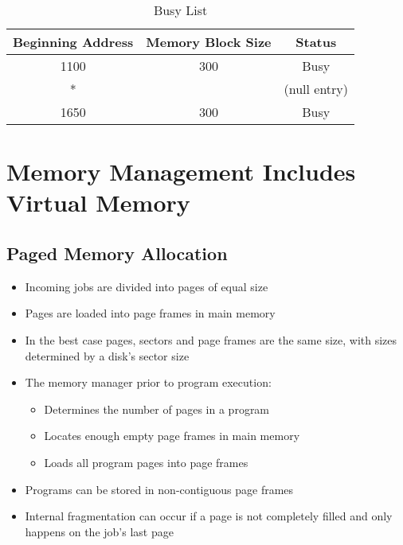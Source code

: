 \documentclass[12pt letter]{report}
\begin{document}
\begin{table}[H]
  \caption{Busy List}
  \begin{center}
    \begin{tabular}{|c c c|}
      \hline
      Beginning Address & Memory Block Size & Status       \\ [0.5ex]
      \hline
      \hline
      1100              & 300               & Busy         \\
      *                 &                   & (null entry) \\
      1650              & 300               & Busy         \\
      \hline
    \end{tabular}
  \end{center}
\end{table}

\chapter{Memory Management Includes Virtual Memory}

\section{Paged Memory Allocation}

\begin{itemize}
  \item Incoming jobs are divided into pages of equal size
  \item Pages are loaded into page frames in main memory
  \item In the best case pages, sectors and page frames are the same size, with sizes determined by a disk's sector size
  \item The memory manager prior to program execution:
        \begin{itemize}
          \item Determines the number of pages in a program
          \item Locates enough empty page frames in main memory
          \item Loads all program pages into page frames
        \end{itemize}
  \item Programs can be stored in non-contiguous page frames
  \item Internal fragmentation can occur if a page is not completely filled and only happens on the job's last page
\end{itemize}
\end{document}
